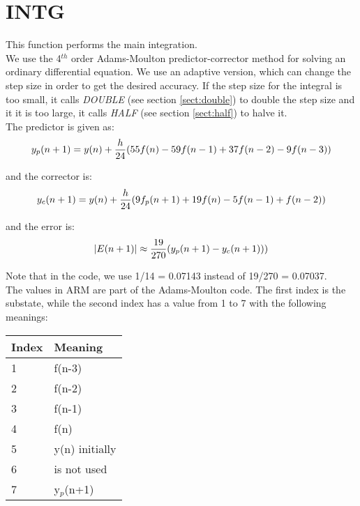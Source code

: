 \section{INTG}
\label{sect:intg}

\noindent This function performs the main integration.\\


\noindent We use the 4$^{th}$ order Adams-Moulton predictor-corrector method
for solving an ordinary differential equation. We use an adaptive version,
which can change the step size in order to get the desired accuracy. If the
step size for the integral is too small, it calls {\em DOUBLE} (see section
\ref{sect:double}) to double the step size and it it is too large, it calls
{\em HALF} (see section \ref{sect:half}) to halve it.\\

\noindent The predictor is given as:\\

\begin{equation}
y_p(n+1) = y(n) + {h \over 24} (55 f(n) - 59 f(n-1) + 37 f(n-2) - 9 f(n-3))
\end{equation}

\noindent and the corrector is:\\

\begin{equation}
y_c(n+1) = y(n) + {h \over 24} (9 f_p(n+1) + 19 f(n) - 5 f(n-1) + f(n-2))
\end{equation}

\noindent and the error is:\\

\begin{equation}
|E(n+1)| \approx {19 \over 270} (y_p(n+1) - y_c(n+1)))
\end{equation}

\noindent Note that in the code, we use 1/14 = 0.07143 instead of 19/270 =
0.07037.\\

\noindent The values in ARM are part of the Adams-Moulton code. The first
index is the substate, while the second index has a value from 1 to 7 with
the following meanings:\\

\begin{center}
\begin{tabular}{|ll|}
\hline
Index & Meaning\\
\hline
1 & f(n-3)\\
2 & f(n-2)\\
3 & f(n-1)\\
4 & f(n)\\
5 & y(n) initially\\
6 & is not used\\
7 & y$_p$(n+1)\\
\hline
\end{tabular}
\end{center}
